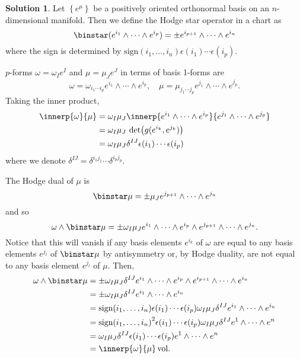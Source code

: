 \documentclass[11pt, a4paper]{report}
\theoremstyle{definition}
\newtheorem{solution}{Solution}[part]
\newenvironment{sol}{\begin{solution}}{\end{solution}\pagebreak[3]}
\renewcommand*{\star}{\ensuremath\mathop{}\mathopen\binstar\mathord{}}
\begin{document}
\begin{sol}

Let $\left\{e^\mu\right\}$ be a positively oriented orthonormal basis on an $n$-dimensional manifold. Then we define the Hodge star operator in a chart as
\[
    \star (e^{i_1} \wedge \cdots \wedge e^{i_p}) = \pm e^{i_{p + 1}} \wedge \cdots \wedge e^{i_n}
\]
where the sign is determined by $\text{sign}(i_1, \ldots, i_n) \epsilon(i_1) \cdots \epsilon(i_p)$.

$p$-forms $\omega = \omega_I e^I$ and $\mu = \mu_J e^J$ in terms of basis 1-forms are
\[
    \omega = \omega_{i_1 \cdots i_p} e^{i_1} \wedge \cdots \wedge e^{i_p}, \quad
    \mu = \mu_{j_1 \cdots j_p} e^{j_1} \wedge \cdots \wedge e^{j_p}.
\]
Taking the inner product,
\begin{align*}
    \innerp{\omega}{\mu} &= \omega_I \mu_J \innerp{e^{i_1} \wedge \cdots \wedge e^{i_p}}{e^{j_1} \wedge \cdots \wedge e^{j_p}} \\
        &= \omega_I \mu_J \, \det \bigl(g(e^{i_k}, e^{j_k})\bigr) \\
        &= \omega_I \mu_J \delta^{IJ} \epsilon(i_1) \cdots \epsilon(i_p)
\end{align*}
where we denote $\delta^{IJ} = \delta^{i_1 j_1} \cdots \delta^{i_p j_p}$.

The Hodge dual of $\mu$ is
\[
    \star \mu = \pm \mu_J e^{j_{p + 1}} \wedge \cdots \wedge e^{j_n}
\]
and so
\[
    \omega \wedge \star \mu = \pm \omega_I \mu_J e^{i_1} \wedge \cdots \wedge e^{i_p} \wedge e^{j_{p + 1}} \wedge \cdots \wedge e^{j_n}.
\]
Notice that this will vanish if any basis elements $e^{i_k}$ of $\omega$ are equal to any basis elements $e^{j_l}$ of $\star \mu$ by antisymmetry or, by Hodge duality, are not equal to any basis element $e^{j_l}$ of $\mu$.
Then,
\begin{align*}
    \omega \wedge \star \mu &= \pm \omega_I \mu_J \delta^{IJ} e^{i_1} \wedge \cdots \wedge e^{i_p} \wedge e^{i_{p + 1}} \wedge \cdots \wedge e^{i_n} \\
        &= \pm \omega_I \mu_J \delta^{IJ} e^{i_1} \wedge \cdots \wedge e^{i_n} \\
        &= \text{sign}(i_1, \ldots, i_n) \epsilon(i_1) \cdots \epsilon(i_p) \omega_I \mu_J \delta^{IJ} e^{i_1} \wedge \cdots \wedge e^{i_n} \\
        &= {\text{sign}(i_1, \ldots, i_n)}^2 \epsilon(i_1) \cdots \epsilon(i_p) \omega_I \mu_J \delta^{IJ} e^1 \wedge \cdots \wedge e^n \\
        &= \omega_I \mu_J \delta^{IJ} \epsilon(i_1) \cdots \epsilon(i_p) e^1 \wedge \cdots \wedge e^n \\
        &= \innerp{\omega}{\mu} \, \text{vol}.
\end{align*}

\end{sol}
\end{document}
